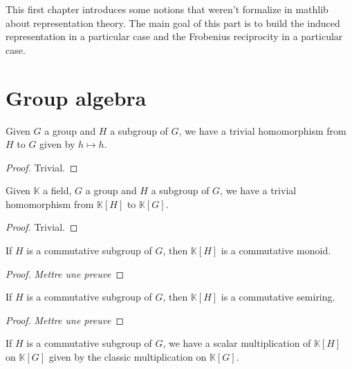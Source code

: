 This first chapter introduces some notions that weren't formalize in
mathlib about representation theory. The main goal of this part is to build
the induced representation in a particular case and the Frobenius reciprocity
in a particular case.

\section{Group algebra}

\begin{definition}
    \label{def:trivialHG}
    \uses{}
    \leanok
    Given $G$ a group and $H$ a subgroup of $G$, we have a trivial homomorphism from $H$
    to $G$ given by $h\mapsto h$.
    \begin{proof}
        \leanok
        Trivial.
    \end{proof}
\end{definition}

\begin{definition}
    \label{def:trivialkHkG}
    \uses{}
    \leanok
    Given $\mathbb{K}$ a field, $G$ a group and $H$ a subgroup of $G$, 
    we have a trivial homomorphism from $\mathbb{K}[H]$ to $\mathbb{K}[G]$.
    \begin{proof}
        \leanok
        Trivial.
    \end{proof}
\end{definition}

\begin{proposition}
    \label{prop:KHcomm}
    \uses{}
    \leanok 
    If $H$ is a commutative subgroup of $G$, then $\mathbb{K}[H]$ is a 
    commutative monoid.
\end{proposition}
\begin{proof}
    \leanok
    \textit{Mettre une preuve}
\end{proof}

\begin{proposition}
    \label{prop:KHcommsemiring}
    \uses{}
    \leanok
    If $H$ is a commutative subgroup of $G$, then $\mathbb{K}[H]$ is a 
    commutative semiring.
\end{proposition}
\begin{proof}
    \leanok
    \textit{Mettre une preuve}
\end{proof}

\begin{definition}
    \label{prop:KHcommsemiring}
    \leanok
    If $H$ is a commutative subgroup of $G$, we have a scalar multiplication
    of $\mathbb{K}[H]$ on $\mathbb{K}[G]$ given by the classic multiplication
    on $\mathbb{K}[G]$.
\end{definition}

